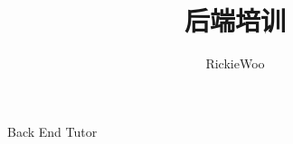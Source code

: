 \documentclass{article}
\author{RickieWoo}
\title{后端培训}
\begin{document}
 
    \maketitle 
    Back End Tutor
	\section{}
 
\end{document}
